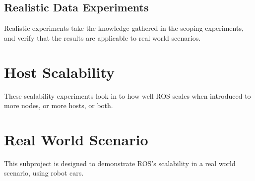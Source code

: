 \documentclass{l4proj}
\begin{document}




\section{Realistic Data Experiments}

Realistic experiments take the knowledge gathered in the scoping experiments, and verify that the results are applicable to real world scenarios.

\chapter{Host Scalability}

These scalability experiments look in to how well ROS scales when introduced to more nodes, or more hosts, or both.



\chapter{Real World Scenario}

This subproject is designed to demonstrate ROS's scalability in a real world scenario, using robot cars.
\end{document}
